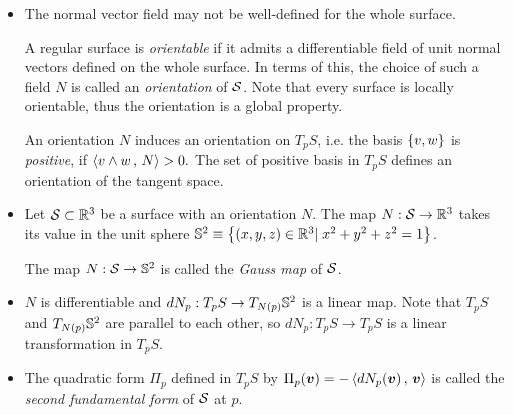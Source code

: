 \documentclass[11pt]{article}
\begin{document}
\begin{itemize}
\item The normal vector field may not be well-defined for the whole surface. 
 \begin{definition}
A regular surface is \emph{orientable} if it admits a differentiable  field  of unit normal vectors defined on the whole surface. In terms of this, the choice of such a field $N$ is called an \emph{orientation} of ${\mathcal S}$. Note that every surface is locally orientable, thus the orientation is a global property. 

 An orientation $N$ induces an orientation on $T_{p}S$, i.e. the basis $\left\{v,w\right\}$ is \emph{positive}, if $\left\langle v\wedge w\,,\, N \right\rangle>0.$ The set of positive basis in $T_{p}S$ defines an orientation of the tangent space. 
  \end{definition} 
 
 \item Let ${\mathcal S}\subset {\mathbb R}^{3}$ be a surface with an orientation $N$. The map $N: {\mathcal S} \rightarrow {\mathbb R}^{3}$ takes its value in the unit sphere ${\mathbb S}^{2}\equiv \left\{(x,y,z)\in {\mathbb R}^{3}|\;  x^{2}+ y^{2}+ z^{2} =1 \right\}$.  
 \begin{definition}
 The map $N: {\mathcal S} \rightarrow {\mathbb S}^{2}$ is called the \emph{Gauss map} of ${\mathcal S}$.\\
\end{definition} 


 
\item $N$ is differentiable and $dN_{p}: T_{p}S \rightarrow T_{N(p)}{\mathbb S}^{2}$ is a linear map. Note that $T_{p}S$ and $T_{N(p)}{\mathbb S}^{2}$ are parallel to each other, so $dN_{p}: T_{p}S \rightarrow T_{p}S$ is a linear transformation in $T_{p}S$.
 



\item \begin{definition}
The quadratic form $\Pi_{p}$ defined in $T_{p}S$ by $\Pi_{p}(\boldsymbol{v}) = -\left\langle dN_{p}(\boldsymbol{v})\,,\, \boldsymbol{v} \right\rangle$ is called the \emph{second fundamental form} of ${\mathcal S}$ at $p$.
\end{definition} 


\end{itemize}
\end{document}
